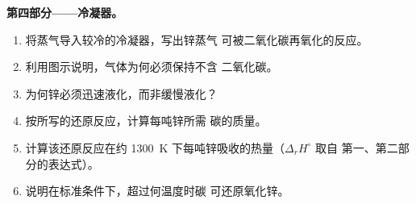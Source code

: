 \begin{problem}
\medskip
\noindent\textbf{第四部分——冷凝器。}
\begin{enumerate}[resume]
  \item 将蒸气导入较冷的冷凝器，写出锌蒸气
        可被二氧化碳再氧化的反应。
  \item 利用图示说明，气体为何必须保持不含
        二氧化碳。
  \item 为何锌必须迅速液化，而非缓慢液化？
  \item 按所写的还原反应，计算每吨锌所需
        碳的质量。
  \item 计算该还原反应在约
        \qty{1300}{K} 下每吨锌吸收的热量（$\Delta_r H^\circ$ 取自
        第一、第二部分的表达式）。
  \item 说明在标准条件下，超过何温度时碳
        可还原氧化锌。
\end{enumerate}
\end{problem}
